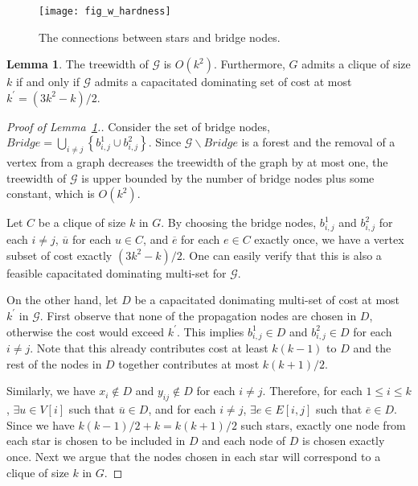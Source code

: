 \documentclass[a4paper,11pt]{article}
\theoremstyle{definition}
\newtheorem{lemma}[theorem]{Lemma}
\newcommand{\G}{\mathcal G}
\begin{document}
\begin{figure}[h]
\centering
\caption{The connections between stars and bridge nodes.}
\texttt{[image: fig\_w\_hardness]}
\end{figure}

\begin{lemma} \label{lemma_w_1_hardness}
The treewidth of $\G$ is $O(k^2)$. Furthermore, $G$ admits a clique of size $k$ if and only if $\G$ admits a capacitated dominating set of cost at most $k^\prime = (3k^2-k)/2$.
\end{lemma}

\begin{proof}[Proof of Lemma~\ref{lemma_w_1_hardness}.]
Consider the set of bridge nodes, $Bridge = \bigcup_{i \ne j}\left\{b^1_{i,j} \cup b^2_{i,j}\right\}$. Since $\G \backslash Bridge$ is a forest and the removal of a vertex from a graph decreases the treewidth of the graph by at most one, the treewidth of $\G$ is upper bounded by the number of bridge nodes plus some constant, which is $O(k^2)$.

Let $C$ be a clique of size $k$ in $G$. By choosing the bridge nodes, $b^1_{i,j}$ and $b^2_{i,j}$ for each $i\ne j$, $\overline{u}$ for each $u \in C$, and $\overline{e}$ for each $e \in C$ exactly once, we have a vertex subset of cost exactly $(3k^2-k)/2$. One can easily verify that this is also a feasible capacitated dominating multi-set for $\G$.

On the other hand, let $D$ be a capacitated donimating multi-set of cost at most $k^\prime$ in $\G$. First observe that none of the propagation nodes are chosen in $D$, otherwise the cost would exceed $k^\prime$. This implies $b^1_{i,j} \in D$ and $b^2_{i,j} \in D$ for each $i\ne j$. Note that this already contributes cost at least $k(k-1)$ to $D$ and the rest of the nodes in $D$ together contributes at most $k(k+1)/2$. 

Similarly, we have $x_i \notin D$ and $y_{ij} \notin D$ for each $i \ne j$. Therefore, for each $1\le i\le k$, $\exists u \in V[i]$ such that $\overline{u} \in D$, and for each $i \ne j$, $\exists e \in E[i,j]$ such that $\overline{e} \in D$. Since we have $k(k-1)/2+k = k(k+1)/2$ such stars, exactly one node from each star is chosen to be included in $D$ and each node of $D$ is chosen exactly once. Next we argue that the nodes chosen in each star will correspond to a clique of size $k$ in $G$.


\end{proof}
\end{document}
